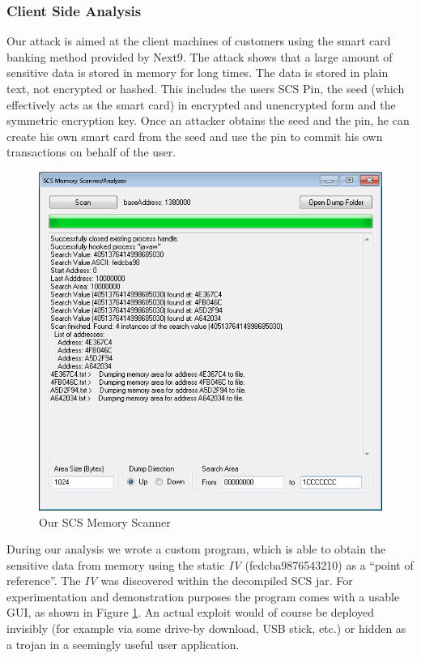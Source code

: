 \documentclass{llncs}
\begin{document}
\subsubsection{Client Side Analysis}
Our attack is aimed at the client machines of customers using the smart card banking method provided by Next9. The attack shows that a large amount of sensitive data is stored in memory for long times. The data is stored in plain text, not encrypted or hashed. This includes the users SCS Pin, the seed (which effectively acts as the smart card) in encrypted and unencrypted form and the symmetric encryption key. Once an attacker obtains the seed and the pin, he can create his own smart card from the seed and use the pin to commit his own transactions on behalf of the user.
\begin{center}
\begin{figure}[hbtp]
        \centering
        \includegraphics[scale=0.6]{Scanner.png}
        \caption{Our SCS Memory Scanner}\label{figMemoryScanner}
\end{figure}
\end{center}
During our analysis we wrote a custom program, which is able to obtain the sensitive data from memory using the static \emph{IV} (fedcba9876543210) as a ``point of reference''. The \emph{IV} was discovered within the decompiled SCS jar. For experimentation and demonstration purposes the program comes with a usable GUI, as shown in Figure \ref{figMemoryScanner}. An actual exploit would of course be deployed invisibly (for example via some drive-by download, USB stick, etc.) or hidden as a trojan in a seemingly useful user application.
\end{document}
